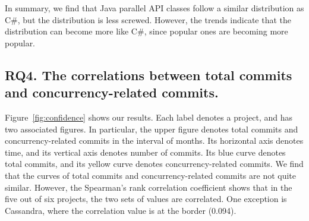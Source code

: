 In summary, we find that Java parallel API classes follow a similar distribution as C\#, but the distribution is less screwed. However, the trends indicate that the distribution can become more like C\#, since popular ones are becoming more popular.





\subsection{RQ4. The correlations between total commits and concurrency-related commits.}
\label{sec:result:correlation}




Figure~\ref{fig:confidence} shows our results. Each label denotes a project, and has two associated figures. In particular, the upper figure denotes total commits and concurrency-related commits in the interval of months. Its horizontal axis denotes time, and its vertical axis denotes number of commits. Its blue curve denotes total commits, and its yellow curve denotes concurrency-related commits. We find that the curves of total commits and concurrency-related commits are not quite similar. However, the Spearman's rank
correlation coefficient shows that in the five out of six projects, the two sets of values are correlated. One exception is Cassandra, where the correlation value is at the border (0.094).

